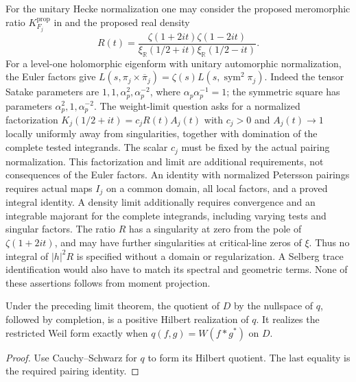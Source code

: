 \begin{remark}
\label{v4-arith:w6-b:conj:sym2-weight-limit}
\label{v4-arith:w6-b:rem:weight-limit-trace}
For the unitary Hecke normalization one may consider the proposed
meromorphic ratio $K_{F_j}^{\mathrm{prop}}$ in
 and the proposed real density
\[
 R(t)=\frac{\zeta(1+2it)\zeta(1-2it)}
 {\xi_{\mathbb R}(1/2+it)\xi_{\mathbb R}(1/2-it)}.
\]
For a level-one holomorphic eigenform with unitary automorphic
normalization, the Euler factors give
$L(s,\pi_j\times\overline\pi_j)=\zeta(s)L(s,\operatorname{sym}^2\pi_j)$.
Indeed the tensor Satake parameters are $1,1,\alpha_p^2,\alpha_p^{-2}$,
where $\alpha_p\alpha_p^{-1}=1$; the symmetric square has parameters
$\alpha_p^2,1,\alpha_p^{-2}$.
The weight-limit question asks for a normalized factorization
$K_j(1/2+it)=c_jR(t)A_j(t)$ with $c_j>0$ and $A_j(t)\to1$
locally uniformly away from singularities, together with domination
of the complete tested integrands. The scalar $c_j$ must be fixed
by the actual pairing normalization. This factorization and limit
are additional requirements, not consequences of the Euler factors.
An identity with normalized Petersson pairings requires actual maps
$I_j$ on a common domain, all local factors, and a proved integral
identity. A density limit additionally requires convergence and an
integrable majorant for the complete integrands, including varying
tests and singular factors. The ratio $R$ has a singularity at zero
from the pole of $\zeta(1+2it)$, and may have further singularities
at critical-line zeros of $\xi$. Thus no integral of $|h|^2R$ is
specified without a domain or regularization. A Selberg trace
identification would also have to match its spectral and geometric
terms. None of these assertions follows from moment projection.
\end{remark}

\begin{corollary}
\label{v4-arith:w6-b:cor:weight-limit-positive}
Under the preceding limit theorem, the quotient of $D$ by the
nullspace of $q$, followed by completion, is a positive Hilbert
realization of $q$. It realizes the restricted Weil form exactly
when $q(f,g)=W(f*g^*)$ on $D$.
\end{corollary}
\begin{proof}
Use Cauchy--Schwarz for $q$ to form its Hilbert quotient.
The last equality is the required pairing identity.
\end{proof}

